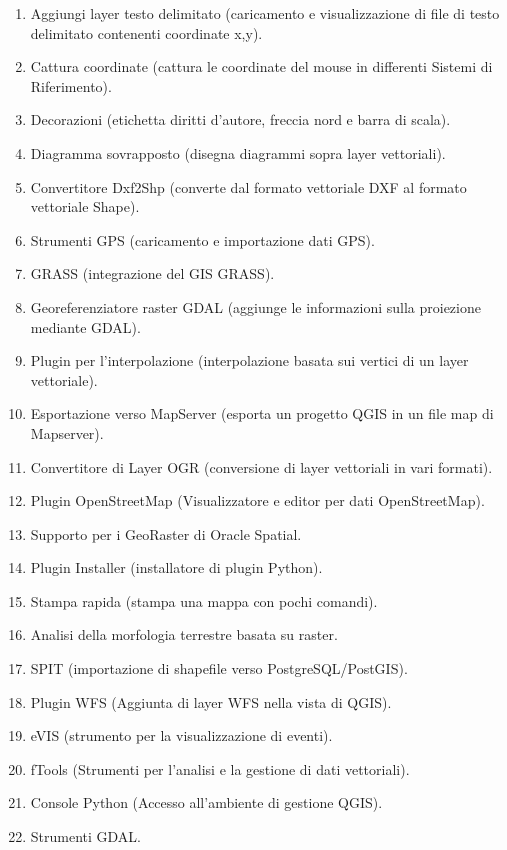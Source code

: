 \begin{enumerate}
\item Aggiungi layer testo delimitato (caricamento e visualizzazione di file di testo delimitato
contenenti coordinate x,y).
\item Cattura coordinate (cattura le coordinate del mouse in differenti Sistemi di Riferimento).
\item Decorazioni (etichetta diritti d’autore, freccia nord e barra di scala).
\item Diagramma sovrapposto (disegna diagrammi sopra layer vettoriali).
\item Convertitore Dxf2Shp (converte dal formato vettoriale DXF al formato vettoriale Shape).
\item Strumenti GPS (caricamento e importazione dati GPS).
\item GRASS (integrazione del GIS GRASS).
\item Georeferenziatore raster GDAL (aggiunge le informazioni sulla proiezione mediante GDAL).
\item Plugin per l’interpolazione (interpolazione basata sui vertici di un layer vettoriale).
\item Esportazione verso MapServer (esporta un progetto QGIS in un file map di Mapserver).
\item Convertitore di Layer OGR (conversione di layer vettoriali in vari formati).
\item Plugin OpenStreetMap (Visualizzatore e editor per dati OpenStreetMap).
\item Supporto per i GeoRaster di Oracle Spatial.
\item Plugin Installer (installatore di plugin Python).
\item Stampa rapida (stampa una mappa con pochi comandi).
\item Analisi della morfologia terrestre basata su raster.
\item SPIT (importazione di shapefile verso PostgreSQL/PostGIS).
\item Plugin WFS (Aggiunta di layer WFS nella vista di QGIS).
\item eVIS (strumento per la visualizzazione di eventi).
\item fTools (Strumenti per l’analisi e la gestione di dati vettoriali).
\item Console Python (Accesso all’ambiente di gestione QGIS).
\item Strumenti GDAL.
\end{enumerate}

